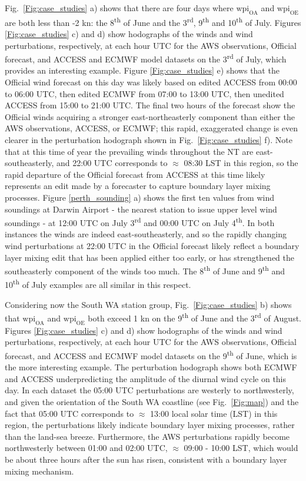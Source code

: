 \documentclass[alpha-refs]{wiley-article}
\begin{document}
Fig.~\ref{Fig:case_studies} a) shows that there are four days where $\text{wpi}_\text{OA}$ and $\text{wpi}_\text{OE}$ are both less than -2 kn: the 8\textsuperscript{th} of June and the 3\textsuperscript{rd}, 9\textsuperscript{th} and 10\textsuperscript{th} of July. Figures \ref{Fig:case_studies} c) and d) show hodographs of the winds and wind perturbations, respectively, at each hour UTC for the AWS observations, Official forecast, and ACCESS and ECMWF model datasets on the 3\textsuperscript{rd} of July, which provides an interesting example. Figure \ref{Fig:case_studies} e) shows that the Official wind forecast on this day was likely based on edited ACCESS from 00:00 to 06:00 UTC, then edited ECMWF from 07:00 to 13:00 UTC, then unedited ACCESS from 15:00 to 21:00 UTC. The final two hours of the forecast show the Official winds acquiring a stronger east-northeasterly component than either the AWS observations, ACCESS, or ECMWF; this rapid, exaggerated change is even clearer in the perturbation hodograph shown in Fig.~\ref{Fig:case_studies} f). Note that at this time of year the prevailing winds throughout the NT are east-southeasterly, and 22:00 UTC corresponds to $\approx$ 08:30 LST in this region, so the rapid departure of the Official forecast from ACCESS at this time likely represents an edit made by a forecaster to capture boundary layer mixing processes. Figure \ref{perth_sounding} a) shows the first ten values from wind soundings at Darwin Airport - the nearest station to issue upper level wind soundings - at 12:00 UTC on July 3\textsuperscript{rd} and 00:00 UTC on July 4\textsuperscript{th}. In both instances the winds are indeed east-southeasterly, and so the rapidly changing wind perturbations at 22:00 UTC in the Official forecast likely reflect a boundary layer mixing edit that has been applied either too early, or has strengthened the southeasterly component of the winds too much. The 8\textsuperscript{th} of June and 9\textsuperscript{th} and 10\textsuperscript{th} of July examples are all similar in this respect.              

Considering now the South WA station group, Fig.~\ref{Fig:case_studies} b) shows that $\text{wpi}_\text{OA}$ and $\text{wpi}_\text{OE}$ both exceed 1 kn on the 9\textsuperscript{th} of June and the 3\textsuperscript{rd} of August. Figures \ref{Fig:case_studies} c) and d) show hodographs of the winds and wind perturbations, respectively, at each hour UTC for the AWS observations, Official forecast, and ACCESS and ECMWF model datasets on the 9\textsuperscript{th} of June, which is the more interesting example. The perturbation hodograph shows both ECMWF and ACCESS underpredicting the amplitude of the diurnal wind cycle on this day. In each dataset the 05:00 UTC perturbations are westerly to northwesterly, and given the orientation of the South WA coastline (see Fig.~\ref{Fig:map}) and the fact that 05:00 UTC corresponds to $\approx$ 13:00 local solar time (LST) in this region, the perturbations likely indicate boundary layer mixing processes, rather than the land-sea breeze. Furthermore, the AWS perturbations rapidly become northwesterly between 01:00 and 02:00 UTC, $\approx$ 09:00 - 10:00 LST, which would be about three hours after the sun has risen, consistent with a boundary layer mixing mechanism. 
\end{document}
